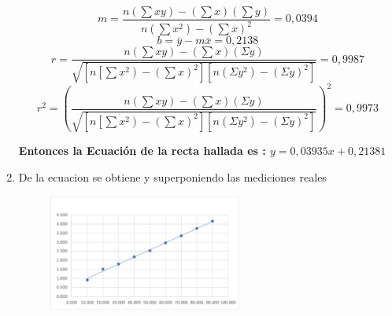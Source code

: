 \begin{enumerate}
	      \begin{equation*}
		      m=\dfrac{n\left(\sum x y\right)-\left(\sum x\right)\left(\sum y\right)}{n\left(\sum x^2\right)-\left(\sum x\right)^2}=0,0394
	      \end{equation*}
	      \begin{equation*}
		      b=\bar{y}-m \bar{x}=0,2138
	      \end{equation*}
	      \begin{equation*}
		      r=\dfrac{n\left(\sum x y\right)-\left(\sum x\right)(\Sigma y)}{\sqrt{\left[n\left[\sum x^2\right)-\left(\sum x\right)^2\right]\left[n\left(\Sigma y^2\right)-(\Sigma y)^2\right]}}=0,9987
	      \end{equation*}
	      \begin{equation*}
		      r^2=(\dfrac{n\left(\sum x y\right)-\left(\sum x\right)(\Sigma y)}{\sqrt{\left[n\left[\sum x^2\right)-\left(\sum x\right)^2\right]\left[n\left(\Sigma y^2\right)-(\Sigma y)^2\right]}})^2=0,9973
	      \end{equation*}

	      \textbf{Entonces la Ecuación de la recta hallada es : $y = 0,03935x + 0,21381$}
	\item De la ecuacion se obtiene y superponiendo las mediciones reales

	      \begin{figure}[H]
		      \begin{center}
			      \includegraphics[width = 0.6\textwidth]{Imagenes/Imagen3.png}
		      \end{center}
	      \end{figure}
\end{enumerate}

